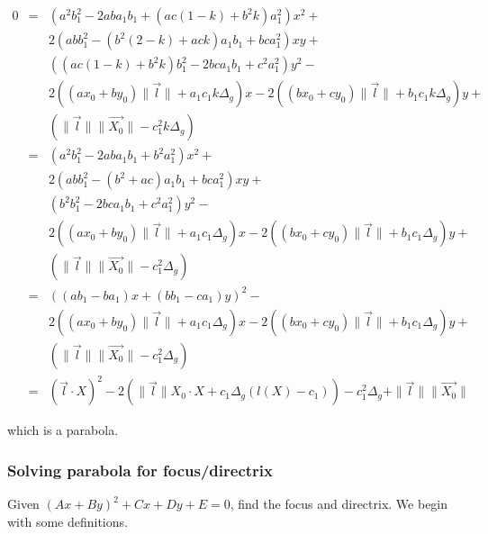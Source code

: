 \documentclass{article}
\begin{document}
\begin{eqnarray}
0 & = & (a^2b_1^2 - 2aba_1b_1 + (ac(1 - k) + b^2k)a_1^2)x^2 + \nonumber\\
  &   & 2(abb_1^2 - (b^2(2 - k) + ack)a_1b_1 + bca_1^2)xy + \nonumber\\
  &   & ((ac(1-k) + b^2k)b_1^2 - 2bca_1b_1 + c^2a_1^2)y^2 - \nonumber\\
  &   & 2((ax_0 + by_0)\|\vec{l}\| + a_1c_1k\Delta_g)x - 2((bx_0 + cy_0)\|\vec{l}\| + b_1c_1k\Delta_g)y + \nonumber\\
  &   & (\|\vec{l}\|\|\vec{X_0}\| - c_1^2k\Delta_g)\\
  & = & (a^2b_1^2 - 2aba_1b_1 + b^2a_1^2)x^2 + \nonumber\\
  &   & 2(abb_1^2 - (b^2 + ac)a_1b_1 + bca_1^2)xy + \nonumber\\
  &   & (b^2b_1^2 - 2bca_1b_1 + c^2a_1^2)y^2 - \nonumber\\
  &   & 2((ax_0 + by_0)\|\vec{l}\| + a_1c_1\Delta_g)x - 2((bx_0 + cy_0)\|\vec{l}\| + b_1c_1\Delta_g)y + \nonumber\\
  &   & (\|\vec{l}\|\|\vec{X_0}\| - c_1^2\Delta_g)\\
  & = & ((ab_1 - ba_1)x + (bb_1 - ca_1)y)^2 - \nonumber\\
  &   & 2((ax_0 + by_0)\|\vec{l}\| + a_1c_1\Delta_g)x - 2((bx_0 + cy_0)\|\vec{l}\| + b_1c_1\Delta_g)y + \nonumber\\
  &   & (\|\vec{l}\|\|\vec{X_0}\| - c_1^2\Delta_g)\\
  & = & (\vec{l}\cdot X)^2 - 2(\|\vec{l}\|X_0\cdot X  + c_1\Delta_g(l(X) - c_1)) - c_1^2\Delta_g + \|\vec{l}\|\|\vec{X_0}\|
\end{eqnarray}

which is a parabola.

\subsubsection{Solving parabola for focus/directrix}

Given $(Ax + By)^2 + Cx + Dy + E = 0$, find the focus and directrix. We begin with some definitions.
\end{document}
